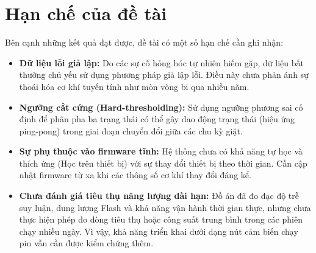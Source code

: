 \section{Hạn chế của đề tài}

Bên cạnh những kết quả đạt được, đề tài có một số hạn chế cần ghi nhận:

\begin{itemize}
    \item \textbf{Dữ liệu lỗi giả lập:} Do các sự cố hỏng hóc tự nhiên hiếm gặp, dữ liệu bất thường chủ yếu sử dụng phương pháp giả lập lỗi. Điều này chưa phản ánh sự thoái hóa cơ khí tuyến tính như mòn vòng bi qua nhiều năm.
    
    \item \textbf{Ngưỡng cắt cứng (Hard-thresholding):} Sử dụng ngưỡng phương sai cố định để phân pha ba trạng thái có thể gây dao động trạng thái (hiệu ứng ping-pong) trong giai đoạn chuyển đổi giữa các chu kỳ giặt.
    
    \item \textbf{Sự phụ thuộc vào firmware tĩnh:} Hệ thống chưa có khả năng tự học và thích ứng (Học trên thiết bị) với sự thay đổi thiết bị theo thời gian. Cần cập nhật firmware từ xa khi các thông số cơ khí thay đổi đáng kể.

    \item \textbf{Chưa đánh giá tiêu thụ năng lượng dài hạn:} Đồ án đã đo đạc độ trễ suy luận, dung lượng Flash và khả năng vận hành thời gian thực, nhưng chưa thực hiện phép đo dòng tiêu thụ hoặc công suất trung bình trong các phiên chạy nhiều ngày. Vì vậy, khả năng triển khai dưới dạng nút cảm biến chạy pin vẫn cần được kiểm chứng thêm.
\end{itemize}
